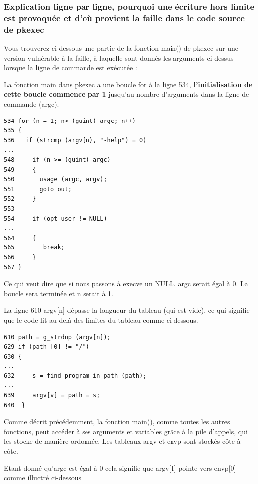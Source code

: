 \documentclass[12pt,a4paper]{article}
\begin{document}
\begin{flushleft}
            \subsubsection{Explication ligne par ligne, pourquoi une écriture hors limite est provoquée et d'où provient la faille dans le code source de pkexec}
                \item  Vous trouverez ci-dessous une partie de la fonction main() de pkexec sur une version vulnérable à la faille, à laquelle sont donnés les arguments ci-dessus lorsque la ligne de commande est exécutée :
                \item La fonction main{} dans pkexec a une boucle for à la ligne 534, \textbf{l'initialisation de cette boucle commence par 1} jusqu'au nombre d'arguments dans la ligne de commande (argc).
                \begin{lstlisting}
534 for (n = 1; n< (guint) argc; n++)
535 {
536   if (strcmp (argv[n), "-help") = 0)
...
548     if (n >= (guint) argc)
549     {
550       usage (argc, argv);  
551       goto out;
552     }
553
554     if (opt_user != NULL)
...
564     {
565        break;
566     }
567 }
                \end{lstlisting}
                \item Ce qui veut dire que si nous passons à execve un NULL. argc serait égal à 0. La boucle sera terminée et n serait à 1.
                \item La ligne 610 argv[n] dépasse la longueur du tableau (qui est vide), ce qui signifie que le code lit au-delà des limites du tableau comme ci-dessous.
                \begin{lstlisting}
610 path = g_strdup (argv[n]);
629 if (path [0] != "/")
630 {
...
632     s = find_program_in_path (path);
...
639     argv[v] = path = s;
640  }
                \end{lstlisting}
                \item Comme décrit précédemment, la fonction main(), comme toutes les autres fonctions, peut accéder à ses arguments et variables grâce à la pile d’appels, qui les stocke de manière ordonnée. Les tableaux argv et envp sont stockés côte à côte.
                \item  Etant donné qu'argc est égal à 0 cela signifie que argv[1] pointe vers envp[0] comme illuctré ci-dessous
                \begin{center}

\end{center}
\end{flushleft}
\end{document}
